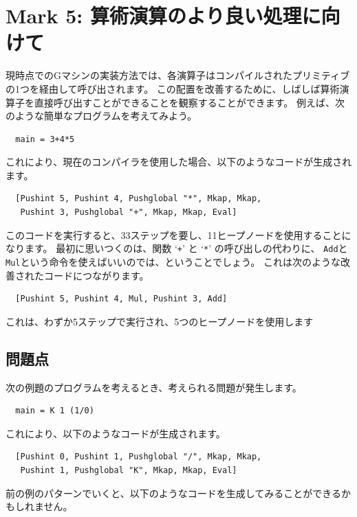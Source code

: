 \documentclass{jbook}
\begin{document}
\section{Mark 5: 算術演算のより良い処理に向けて}

現時点でのGマシンの実装方法では、各演算子はコンパイルされたプリミティブの1つを経由して呼び出されます。
この配置を改善するために、しばしば算術演算子を直接呼び出すことができることを観察することができます。
例えば、次のような簡単なプログラムを考えてみよう。

\begin{verbatim}
  main = 3+4*5
\end{verbatim}

これにより、現在のコンパイラを使用した場合、以下のようなコードが生成されます。

\begin{verbatim}
  [Pushint 5, Pushint 4, Pushglobal "*", Mkap, Mkap,
   Pushint 3, Pushglobal "+", Mkap, Mkap, Eval]
\end{verbatim}

このコードを実行すると、33ステップを要し、11ヒープノードを使用することになります。
最初に思いつくのは、関数 `\texttt{+}' と `\texttt{*}' の呼び出しの代わりに、
\texttt{Add}と\texttt{Mul}という命令を使えばいいのでは、ということでしょう。
これは次のような改善されたコードにつながります。

\begin{verbatim}
  [Pushint 5, Pushint 4, Mul, Pushint 3, Add]
\end{verbatim}

これは、わずか5ステップで実行され、5つのヒープノードを使用します

\subsection{問題点}

次の例題のプログラムを考えるとき、考えられる問題が発生します。

\begin{verbatim}
  main = K 1 (1/0)
\end{verbatim}

これにより、以下のようなコードが生成されます。

\begin{verbatim}
  [Pushint 0, Pushint 1, Pushglobal "/", Mkap, Mkap,
   Pushint 1, Pushglobal "K", Mkap, Mkap, Eval]
\end{verbatim}

前の例のパターンでいくと、以下のようなコードを生成してみることができるかもしれません。
\end{document}

